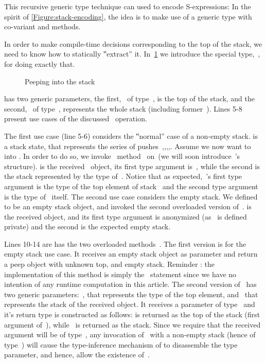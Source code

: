 This recursive generic type technique can used to encode S-expressions: In the spirit of
  \cref{Figure:stack-encoding}, the idea is to make use of a  generic type
  with co-variant  and  methods.

In order to make compile-time decisions corresponding to the top of the stack,
  we need to know how to statically ‟extract” it.
In~\cref{Figure:peep} we introduce the special type,~, for doing exactly that.

\begin{figure}[htb]%
  \caption{Peeping into the stack}%
  \label{Figure:peep}%
  \lstset{style=numbered}
\end{figure}

 has two generic parameters, the first,~ of type~, is the top of the stack,
  and the second,~ of type~, represents the whole stack (including former~).
Lines 5-8 present use cases of the discussed~ operation.

The first use case (line 5-6) considers the ‟normal” case of a non-empty stack.
 is a stack state, that represents the series
  of pushes~,,,,.
Assume we now want to~ into .
In order to do so, we invoke~ method~ on~(we will soon introduce~'s structure).
 is the received~ object, its first type argument is~,
  while the second is the stack represented by the type of~.
Notice that as expected,~'s first type argument is the type of the top element of stack~
  and the second type argument is the type of~ itself.
The second use case considers the empty stack.
We defined  to be an empty stack object, and invoked the second overloaded version of~.
 is the received object, and its first type argument is anonymized (as~ is defined private)
and the second is the expected empty stack.

Lines 10-14 are has the two overloaded methods~.
The first version is for the empty stack use case.
It receives an empty stack object as parameter and return a peep object with unknown top, and empty stack.
Reminder : the implementation of this method is simply the~ statement since
  we have no intention of any runtime computation in this article.
The second version of~ has two generic
  parameters:~, that represents the type of the top element,
  and~ that represents the stack of the received object.
It receives a parameter of type~ and
  it's return type is constructed as follows:
   is returned as the top of the stack (first argument of~),
  while~ is returned as the stack.
Since we require that the received argument
  will be of type~,
  any invocation of~ with a non-empty stack (hence of type~)
  will cause the type-inference mechanism of \Java to disassemble the type parameter,
  and hence, allow the existence of~.
